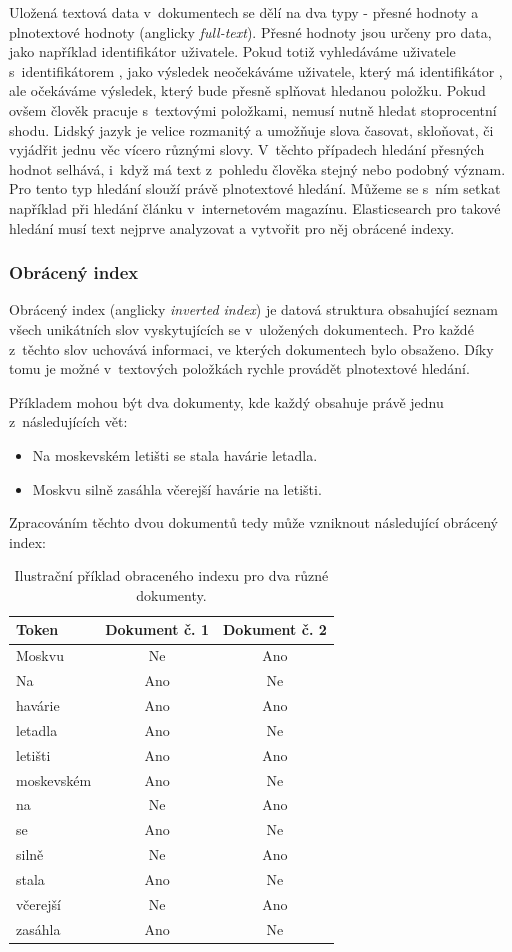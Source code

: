 Uložená textová data v~dokumentech se dělí na dva typy - přesné hodnoty a plnotextové hodnoty (anglicky \emph{full-text}). Přesné hodnoty jsou určeny pro data, jako například identifikátor uživatele. Pokud totiž vyhledáváme uživatele s~identifikátorem , jako výsledek neočekáváme uživatele, který má identifikátor , ale očekáváme výsledek, který bude přesně splňovat hledanou položku.
Pokud ovšem člověk pracuje s~textovými položkami, nemusí nutně hledat stoprocentní shodu. Lidský jazyk je velice rozmanitý a umožňuje slova časovat, skloňovat, či vyjádřit jednu věc vícero různými slovy.
V~těchto případech hledání přesných hodnot selhává, i~když má text z~pohledu člověka stejný nebo podobný význam. Pro tento typ hledání slouží právě plnotextové hledání. Můžeme se s~ním setkat například při hledání článku v~internetovém magazínu.
Elasticsearch pro takové hledání musí text nejprve analyzovat a vytvořit pro něj obrácené indexy.

\subsubsection*{Obrácený index}
Obrácený index (anglicky \emph{inverted index}) je datová struktura obsahující seznam všech unikátních slov vyskytujících se v~uložených dokumentech. Pro každé z~těchto slov uchovává informaci, ve kterých dokumentech bylo obsaženo. Díky tomu je možné v~textových položkách rychle provádět plnotextové hledání.

Příkladem mohou být dva dokumenty, kde každý obsahuje právě jednu z~následujících vět:
\begin{itemize}
    \item Na moskevském letišti se stala havárie letadla.
    \item Moskvu silně zasáhla včerejší havárie na letišti.
\end{itemize}
Zpracováním těchto dvou dokumentů tedy může vzniknout následující obrácený index:


\begin{table}[h!]
\centering
\begin{tabular}{ |l|c|c| } 
\hline
Token & Dokument č. 1 & Dokument č. 2 \\
\hline
Moskvu & Ne & Ano \\
Na & Ano & Ne \\
havárie & Ano & Ano \\
letadla & Ano & Ne \\
letišti & Ano & Ano \\
moskevském & Ano & Ne \\
na & Ne & Ano \\
se & Ano & Ne \\
silně & Ne & Ano \\
stala & Ano & Ne \\
včerejší & Ne & Ano \\
zasáhla & Ano & Ne \\
\hline
\end{tabular}
\caption{Ilustrační příklad obraceného indexu pro dva různé dokumenty.}
\end{table}

